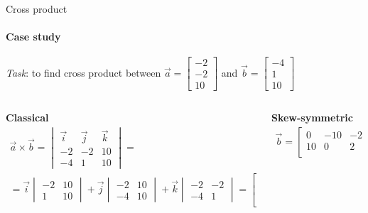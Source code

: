 \documentclass[aspectratio=169,notes]{beamer}
\begin{document}
\begin{frame}[t]{Cross product}
\framesubtitle{Case study}
    \textit{Task}: to find cross product between $\vec{a} = \begin{bmatrix}-2\\-2\\ 10\end{bmatrix}$ and $\vec{b}=\begin{bmatrix}-4\\1\\ 10\end{bmatrix}$

    \vspace*{0.2cm}
    \begin{columns}[T,onlytextwidth]
        \begin{column}{0.49\textwidth}
            \textbf{\LARGE Classical}
            \begin{multline*}
            \vec{a} \times \vec{b} = \begin{vmatrix}
                \vec{i} & \vec{j} & \vec{k}\\ 
                -2 & -2 & 10\\
                -4 & 1 & 10 
           \end{vmatrix} =\\ 
           = \vec{i}\begin{vmatrix} -2 & 10 \\ 1 & 10 \end{vmatrix} + 
           \vec{j}\begin{vmatrix} -2 & 10 \\ -4 & 10 \end{vmatrix} +
           \vec{k}\begin{vmatrix} -2 & -2 \\ -4 & 1 \end{vmatrix} = \begin{bmatrix}-30\\ -20\\ -10 \end{bmatrix}
           \end{multline*}
        \end{column}
        \begin{column}{0.49\textwidth}
            \textbf{\LARGE Skew-symmetric}
            \begin{align*}
                [\vec{a}\times]\vec{b}=\begin{bmatrix}
                    0 & -10 & -2 \\
                    10 & 0 & 2 \\ 

\end{bmatrix}
\end{align*}
\end{column}
\end{columns}
\end{frame}
\end{document}
